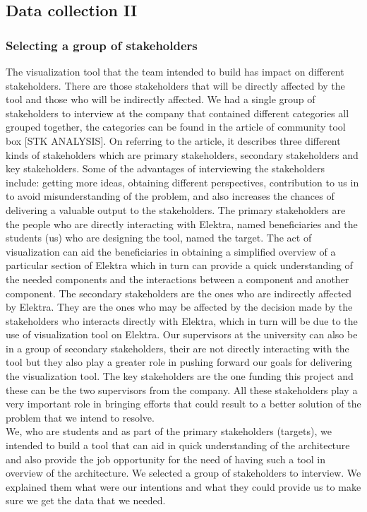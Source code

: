 \subsection{Data collection II}

\subsubsection{Selecting a group of stakeholders}
The visualization tool that the team intended to build has impact on different stakeholders. There are those stakeholders that will be directly affected by the tool and those who will be indirectly affected. We had a single group of stakeholders to interview at the company that contained different categories all grouped together, the categories can be found in the article of community tool box [STK ANALYSIS]. On referring to the article, it describes three different kinds of stakeholders which are primary stakeholders, secondary stakeholders and key stakeholders. Some of the advantages of interviewing the stakeholders include:  getting more ideas, obtaining different perspectives, contribution to us in to avoid misunderstanding of the problem, and also increases the chances of delivering a valuable output to the stakeholders. The primary stakeholders are the people who are directly interacting with Elektra, named beneficiaries and the students (us) who are designing the tool, named the target. The act of visualization can aid the beneficiaries in obtaining a simplified overview of a particular section of Elektra which in turn can provide a quick understanding of the needed components and the interactions between a component and another component. The secondary stakeholders are the ones who are indirectly affected by Elektra. They are the ones who may be affected by the decision made by the stakeholders who interacts directly with Elektra, which in turn will be due to the use of visualization tool on Elektra. Our supervisors at the university can also be in a group of secondary stakeholders, their are not directly interacting with the tool but they also play a greater role in pushing forward our goals for delivering the visualization tool. The key stakeholders are the one funding this project and these can be the two supervisors from the company. All these stakeholders play a very important role in bringing efforts that could result to a better solution of the problem that we intend to resolve.\\
We, who are students and as part of the primary stakeholders (targets), we intended to build a tool that can aid in quick understanding of the architecture and also provide the job opportunity for the need of having such a tool in overview of the architecture. We selected a group of stakeholders to interview. We explained them what were our intentions and what they could provide us to make sure we get the data that we needed.\todo{[to be filled in]}

